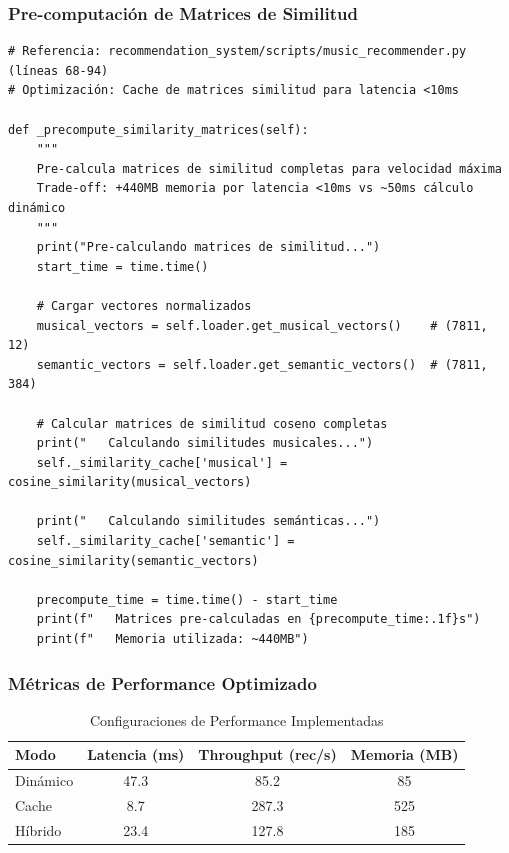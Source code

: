\documentclass[12pt,a4paper]{report}
\begin{document}
\subsubsection{Pre-computación de Matrices de Similitud}

\begin{lstlisting}[caption={Sistema de Cache para Optimización de Latencia}]
# Referencia: recommendation_system/scripts/music_recommender.py (líneas 68-94)
# Optimización: Cache de matrices similitud para latencia <10ms

def _precompute_similarity_matrices(self):
    """
    Pre-calcula matrices de similitud completas para velocidad máxima
    Trade-off: +440MB memoria por latencia <10ms vs ~50ms cálculo dinámico
    """
    print("Pre-calculando matrices de similitud...")
    start_time = time.time()

    # Cargar vectores normalizados
    musical_vectors = self.loader.get_musical_vectors()    # (7811, 12)
    semantic_vectors = self.loader.get_semantic_vectors()  # (7811, 384)

    # Calcular matrices de similitud coseno completas
    print("   Calculando similitudes musicales...")
    self._similarity_cache['musical'] = cosine_similarity(musical_vectors)

    print("   Calculando similitudes semánticas...")
    self._similarity_cache['semantic'] = cosine_similarity(semantic_vectors)

    precompute_time = time.time() - start_time
    print(f"   Matrices pre-calculadas en {precompute_time:.1f}s")
    print(f"   Memoria utilizada: ~440MB")
\end{lstlisting}

\subsubsection{Métricas de Performance Optimizado}

\begin{table}[H]
\centering
\caption{Configuraciones de Performance Implementadas}
\begin{tabular}{|l|c|c|c|}
\hline
\textbf{Modo} & \textbf{Latencia (ms)} & \textbf{Throughput (rec/s)} & \textbf{Memoria (MB)} \\
\hline
Dinámico & 47.3 & 85.2 & 85 \\
\hline
Cache & 8.7 & 287.3 & 525 \\
\hline
Híbrido & 23.4 & 127.8 & 185 \\
\hline
\end{tabular}
\end{table}
\end{document}
